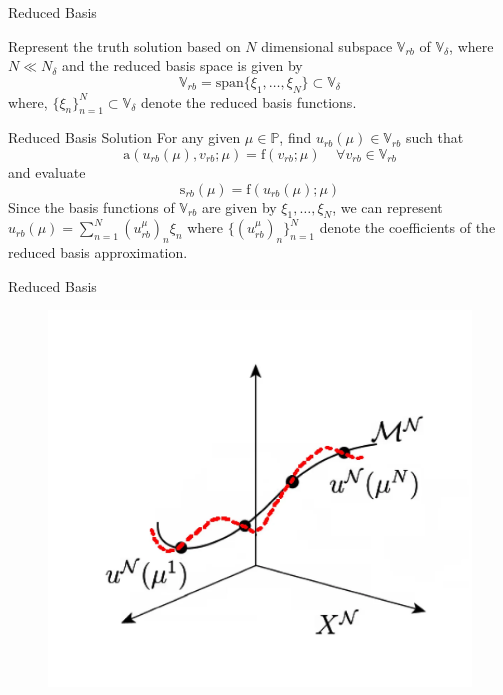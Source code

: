 \documentclass[9pt]{beamer}
\begin{document}
\begin{frame}{Reduced Basis}
    \begin{block}{}
        Represent the truth solution based on $N$ dimensional subspace $\mathbb{V}_{rb}$ of $\mathbb{V}_{\delta}$, where $N \ll N_{\delta}$ and the reduced basis space is given by 
    $$ \mathbb{V}_{rb} = \mathrm{span}\{\xi_1,\dots,\xi_N\} \subset \mathbb{V}_{\delta}$$
    where, $\{\xi_n\}_{n=1}^{N} \subset \mathbb{V}_{\delta}$ denote the reduced basis functions.
    \end{block}
    \begin{exampleblock}{Reduced Basis Solution}
        For any given $\mu \in \mathbb{P}$, find $u_{rb}(\mu) \in \mathbb{V}_{rb}$ such that
        $$\mathrm{a}(u_{rb}(\mu), v_{rb}; \mu) = \mathrm{f}(v_{rb};\mu) \mspace{20mu} \forall v_{rb} \in \mathbb{V}_{rb}$$
        and evaluate 
        $$\mathrm{s}_{rb}(\mu) = \mathrm{f}(u_{rb}(\mu);\mu)$$
        Since the basis functions of $\mathbb{V}_{rb}$ are given by $\xi_1,\dots,\xi_N$, we can represent $u_{rb}(\mu) = \sum_{n=1}^{N}(u_{rb}^{\mu})_n \xi_n$ where $\{(u_{rb}^{\mu})_n\}_{n=1}^{N}$ denote the coefficients of the reduced basis approximation.
    \end{exampleblock}
\end{frame}

\begin{frame}{Reduced Basis}
    \begin{figure}
        \centering
        \includegraphics[height=0.8\paperheight]{Manifold.png}
    \end{figure}
\end{frame}
\end{document}

